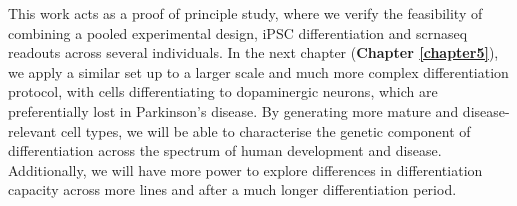 This work acts as a proof of principle study, where we verify the feasibility of combining a pooled experimental design, iPSC differentiation and \gls{scrnaseq} readouts across several individuals.
In the next chapter (\textbf{Chapter 
\ref{chapter5}}),
we apply a similar set up to a larger scale and much more complex differentiation protocol, with cells differentiating to dopaminergic neurons, which are preferentially lost in Parkinson's disease.
By generating more mature and disease-relevant cell types, we will be able to characterise the genetic component of differentiation across the spectrum of human development and disease.
Additionally, we will have more power to explore differences in differentiation capacity across more lines and after a much longer differentiation period.

